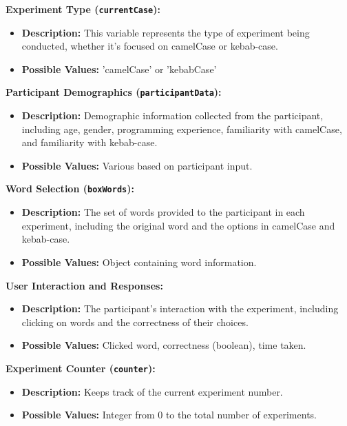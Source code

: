 \documentclass{article}
\begin{document}
\begin{tcolorbox}[title=Independent Variables]

\textbf{Experiment Type (\texttt{currentCase}):}
\begin{itemize}
    \item \textbf{Description:} This variable represents the type of experiment being conducted, whether it's focused on camelCase or kebab-case.
    \item \textbf{Possible Values:} 'camelCase' or 'kebabCase'
\end{itemize}

\textbf{Participant Demographics (\texttt{participantData}):}
\begin{itemize}
    \item \textbf{Description:} Demographic information collected from the participant, including age, gender, programming experience, familiarity with camelCase, and familiarity with kebab-case.
    \item \textbf{Possible Values:} Various based on participant input.
\end{itemize}

\end{tcolorbox}

\begin{tcolorbox}[title=Dependent Variables]

\textbf{Word Selection (\texttt{boxWords}):}
\begin{itemize}
    \item \textbf{Description:} The set of words provided to the participant in each experiment, including the original word and the options in camelCase and kebab-case.
    \item \textbf{Possible Values:} Object containing word information.
\end{itemize}

\textbf{User Interaction and Responses:}
\begin{itemize}
    \item \textbf{Description:} The participant's interaction with the experiment, including clicking on words and the correctness of their choices.
    \item \textbf{Possible Values:} Clicked word, correctness (boolean), time taken.
\end{itemize}

\textbf{Experiment Counter (\texttt{counter}):}
\begin{itemize}
    \item \textbf{Description:} Keeps track of the current experiment number.
    \item \textbf{Possible Values:} Integer from 0 to the total number of experiments.
\end{itemize}

\end{tcolorbox}
\end{document}
